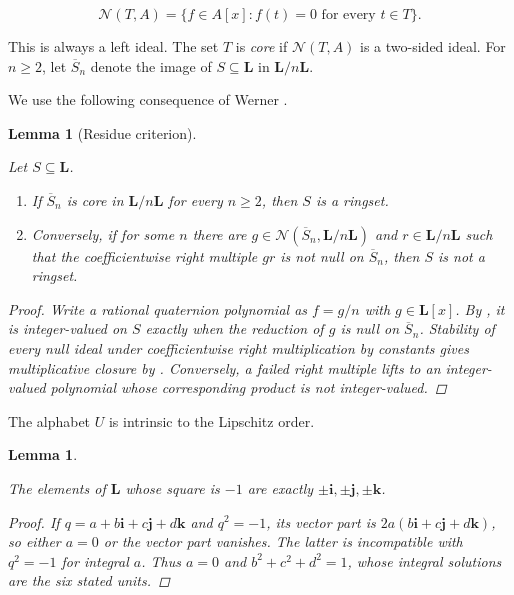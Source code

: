 \documentclass[11pt]{article}
\newtheorem{lemma}[theorem]{Lemma}
\numberwithin{equation}{section}
\begin{document}
\nopagebreak[4]
\[
\mathcal N(T,A)
=\{f\in A[x]:f(t)=0\text{ for every }t\in T\}.
\]

This is always a left ideal. The set $T$ is \emph{core} if
$\mathcal N(T,A)$ is a two-sided ideal. For $n\ge2$, let $\overline S_n$
denote the image of $S\subseteq\mathbf L$ in
$\mathbf L/n\mathbf L$.

We use the following consequence of Werner \cite[Lemmas 5.3 and 5.4]{werner2026}.

\begin{lemma}[Residue criterion]
\label{lem:residue}

Let $S\subseteq\mathbf L$.

\begin{enumerate}
\item If $\overline S_n$ is core in $\mathbf L/n\mathbf L$ for every $n\ge2$,
then $S$ is a ringset.
\item Conversely, if for some $n$ there are
$g\in\mathcal N(\overline S_n,\mathbf L/n\mathbf L)$ and
$r\in\mathbf L/n\mathbf L$ such that the coefficientwise right multiple
$gr$ is not null on $\overline S_n$, then $S$ is not a ringset.

\end{enumerate}

\begin{proof}

Write a rational quaternion polynomial as $f=g/n$ with
$g\in\mathbf L[x]$. By \cite[Lemma 5.3]{werner2026}, it is integer-valued on $S$ exactly
when the reduction of $g$ is null on $\overline S_n$. Stability of every
null ideal under coefficientwise right multiplication by constants gives
multiplicative closure by \cite[Lemma 5.4]{werner2026}. Conversely, a failed right multiple
lifts to an integer-valued polynomial whose corresponding product is not
integer-valued.
\end{proof}

\end{lemma}


The alphabet $U$ is intrinsic to the Lipschitz order.

\begin{lemma}
\label{lem:null-factor}

The elements of $\mathbf L$ whose square is $-1$ are exactly
$\pm\mathbf i,\pm\mathbf j,\pm\mathbf k$.

\begin{proof}

If $q=a+b\mathbf i+c\mathbf j+d\mathbf k$ and $q^2=-1$, its vector part is
$2a(b\mathbf i+c\mathbf j+d\mathbf k)$, so either $a=0$ or the vector part
vanishes. The latter is incompatible with $q^2=-1$ for integral $a$. Thus
$a=0$ and $b^2+c^2+d^2=1$, whose integral solutions are the six stated
units.
\end{proof}

\end{lemma}
\end{document}
